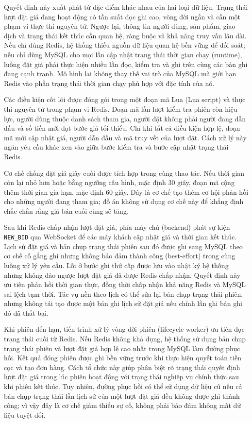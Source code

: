 \documentclass[../DoAn.tex]{subfiles}
\begin{document}
Quyết định này xuất phát từ đặc điểm khác nhau của hai loại dữ liệu. Trạng thái lượt đặt giá đang hoạt động có tần suất đọc ghi cao, vòng đời ngắn và cần một phạm vi thực thi nguyên tử. Ngược lại, thông tin người dùng, sản phẩm, giao dịch và trạng thái kết thúc cần quan hệ, ràng buộc và khả năng truy vấn lâu dài. Nếu chỉ dùng Redis, hệ thống thiếu nguồn dữ liệu quan hệ bền vững để đối soát; nếu chỉ dùng MySQL cho mọi lần cập nhật trạng thái thời gian chạy (runtime), luồng đặt giá phải thực hiện nhiều lần đọc, kiểm tra và ghi trên cùng các bản ghi đang cạnh tranh. Mô hình lai không thay thế vai trò của MySQL mà giới hạn Redis vào phần trạng thái thời gian chạy phù hợp với đặc tính của nó.

Các điều kiện cốt lõi được đóng gói trong một đoạn mã Lua (Lua script) và thực thi nguyên tử trong phạm vi Redis. Đoạn mã lần lượt kiểm tra phiên còn hiệu lực, người dùng thuộc danh sách tham gia, người đặt không phải người đang dẫn đầu và số tiền mới đạt bước giá tối thiểu. Chỉ khi tất cả điều kiện hợp lệ, đoạn mã mới cập nhật giá, người dẫn đầu và mã truy vết của lượt đặt. Cách xử lý này ngăn yêu cầu khác xen vào giữa bước kiểm tra và bước cập nhật trạng thái Redis.

Cơ chế chống đặt giá giây cuối được tích hợp trong cùng thao tác. Nếu thời gian còn lại nhỏ hơn hoặc bằng ngưỡng cấu hình, mặc định 30 giây, đoạn mã cộng thêm thời gian gia hạn, mặc định 60 giây. Đây là cơ chế tạo thêm cơ hội phản hồi cho những người đang tham gia; đồ án không sử dụng cơ chế này để khẳng định chắc chắn rằng giá bán cuối cùng sẽ tăng.

Sau khi Redis chấp nhận lượt đặt giá, phía máy chủ (backend) phát sự kiện \texttt{NEW\_BID} qua WebSocket để các máy khách cập nhật giá và thời gian kết thúc. Lịch sử đặt giá và bản chụp trạng thái phiên sau đó được ghi sang MySQL theo cơ chế cố gắng ghi nhưng không bảo đảm thành công (best-effort) trong cùng luồng xử lý yêu cầu. Lỗi ở bước ghi thứ cấp được lưu vào nhật ký hệ thống nhưng không đảo ngược lượt đặt giá đã được Redis chấp nhận. Quyết định này ưu tiên phản hồi thời gian thực, đồng thời chấp nhận khả năng Redis và MySQL sai lệch tạm thời. Tác vụ nền theo lịch có thể sửa lại bản chụp trạng thái phiên, nhưng không tái tạo được một bản ghi lịch sử đặt giá nếu chính lần ghi bản ghi đó đã thất bại.

Khi phiên đến hạn, tiến trình xử lý vòng đời phiên (lifecycle worker) ưu tiên đọc trạng thái cuối từ Redis. Nếu Redis không khả dụng, hệ thống sử dụng bản chụp trạng thái phiên và lượt đặt giá hợp lệ cao nhất trong MySQL làm đường phục hồi. Kết quả đóng phiên được ghi bền vững trước khi thực hiện quyết toán tiền cọc và tạo đơn hàng. Cách tổ chức này giúp phân biệt rõ trạng thái quyết định lượt đặt giá trong lúc phiên hoạt động với trạng thái nghiệp vụ chính thức sau khi phiên kết thúc. Tuy nhiên, đường phục hồi có thể sử dụng dữ liệu cũ nếu cả bản chụp trạng thái lẫn lịch sử của một lượt đặt giá đều không được ghi thành công; vì vậy đây là cơ chế giảm thiểu sự cố, không phải bảo đảm không mất dữ liệu tuyệt đối.
\end{document}
